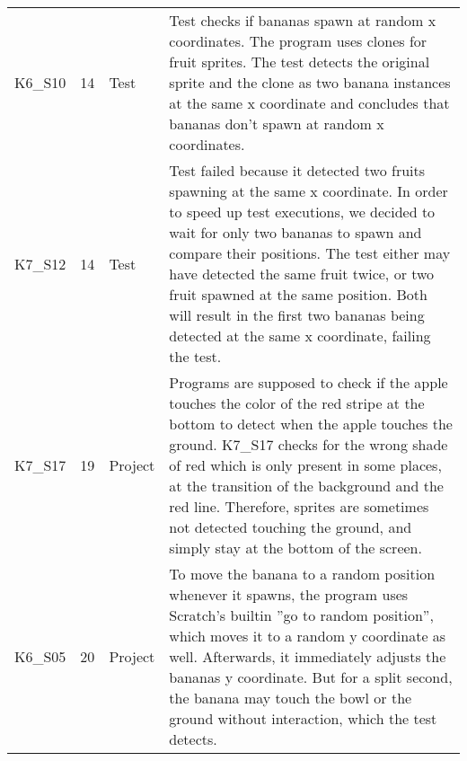 \begin{table}[htpb]
{\begin{tabular}{lrlp{11.25cm}}
        K6\_S10 & 14   & Test    & Test checks if bananas spawn at random x coordinates.
                                   The program uses clones for fruit sprites.
                                   The test detects the original sprite and the clone as two banana instances at the same x coordinate and concludes that bananas don't spawn at random x coordinates. \\
        K7\_S12 & 14   & Test    & Test failed because it detected two fruits spawning at the same x coordinate.
                                   In order to speed up test executions, we decided to wait for only two bananas to spawn and compare their positions.
                                   The test either may have detected the same fruit twice, or two fruit spawned at the same position.
                                   Both will result in the first two bananas being detected at the same x coordinate, failing the test. \\

        K7\_S17 & 19   & Project & Programs are supposed to check if the apple touches the color of the red stripe at the bottom to detect when the apple touches the ground.
                                   K7\_S17 checks for the wrong shade of red which is only present in some places, at the transition of the background and the red line.
                                   Therefore, sprites are sometimes not detected touching the ground, and simply stay at the bottom of the screen. \\

        K6\_S05 & 20   & Project & To move the banana to a random position whenever it spawns,
                                   the program uses Scratch's builtin ''go to random position'', which moves it to a random y coordinate as well.
                                   Afterwards, it immediately adjusts the bananas y coordinate.
                                   But for a split second, the banana may touch the bowl or the ground without interaction, which the test detects. \\


\end{tabular}}
\end{table}
